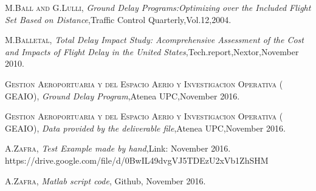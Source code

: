 \documentclass[final,1p]{elsarticle}
\begin{document}
\begin{thebibliography}{X}
 \textsc{M.Ball and G.Lulli},
\textit{Ground Delay Programs:Optimizing over the Included Flight Set Based on Distance},Traffic Control Quarterly,Vol.12,2004.

 \textsc{M.Balletal},
\textit{Total Delay Impact Study: Acomprehensive Assessment of the Cost and Impacts of Flight Delay in the United States},Tech.report,Nextor,November 2010.

 \textsc{Gestion Aeroportuaria y del Espacio Aerio y
Investigacion Operativa ( GEAIO)},
\textit{Ground Delay Program},Atenea UPC,November 2016.

 \textsc{Gestion Aeroportuaria y del Espacio Aerio y
Investigacion Operativa ( GEAIO)},
\textit{Data provided by the deliverable file},Atenea UPC,November 2016.

 \textsc{A.Zafra},
\textit{Test Example made by hand},Link: November 2016.
\\
https://drive.google.com/file/d/0BwIL49dvgVJ5TDEzU2xVb1ZhSHM


 \textsc{A.Zafra},
\textit{Matlab script code}, Github, November 2016.
\end{thebibliography}











\end{document}
